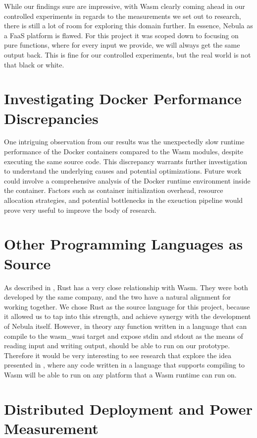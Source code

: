 \documentclass[
  table]{report}
\begin{document}
While our findings sure are impressive, with \ac{Wasm} clearly coming
ahead in our controlled experiments in regards to the measurements we
set out to research, there is still a lot of room for exploring this
domain further. In essence, Nebula as a \ac{FaaS} platform is flawed.
For this project it was scoped down to focusing on pure functions, where
for every input we provide, we will always get the same output back.
This is fine for our controlled experiments, but the real world is not
that black or white.

\section{Investigating Docker Performance Discrepancies}

One intriguing observation from our results was the unexpectedly slow
runtime performance of the Docker containers compared to the \ac{Wasm}
modules, despite executing the same source code. This discrepancy
warrants further investigation to understand the underlying causes and
potential optimizations. Future work could involve a comprehensive
analysis of the Docker runtime environment inside the container. Factors
such as container initialization overhead, resource allocation
strategies, and potential bottlenecks in the exeuction pipeline would
prove very useful to improve the body of research.

\section{Other Programming Languages as Source}

As described in , Rust has a very close
relationship with \ac{Wasm}. They were both developed by the same
company, and the two have a natural alignment for working together. We
chose Rust as the source language for this project, because it allowed
us to tap into this strength, and achieve synergy with the development
of Nebula itself. However, in theory any function written in a language
that can compile to the wasm\_wasi target and expose stdin and stdout as
the means of reading input and writing output, should be able to run on
our prototype. Therefore it would be very interesting to see research
that explore the idea presented in , where any
code written in a language that supports compiling to \ac{Wasm} will be
able to run on any platform that a \ac{Wasm} runtime can run on.

\section{Distributed Deployment and Power Measurement}
\end{document}
